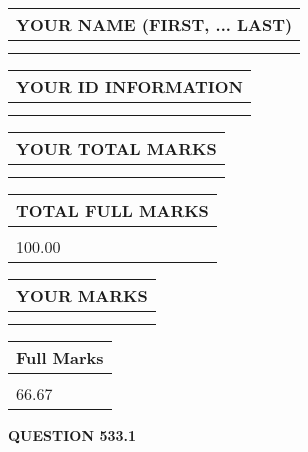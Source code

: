 \documentclass{ctexart}
\begin{document}
   
   
   
\newpage 
\setcounter{page}{ 
   533001 } 
   
   
   
   
\noindent\begin{tabular}{|l|}
\hline
YOUR NAME (FIRST, ... LAST)  \\
\hline
 \\ 
 \\ 
\hline
\end{tabular}
\hspace{0.05in} \begin{tabular}{|l|}
\hline
 YOUR   ID   INFORMATION  \\
\hline
 \\ 
 \\ 
\hline
\end{tabular}
   
   
\vspace{0.2in}\noindent\begin{tabular}{|l|}
\hline
YOUR TOTAL MARKS  \\
\hline
 \\ 
 \\ 
\hline
\end{tabular}
\hspace{0.05in} \begin{tabular}{|l|}
\hline
TOTAL FULL MARKS  \\
\hline
 \\ 
100.00 \\
\hline
\end{tabular}
   
   
 \vspace{0.2in}
 
 
 
 
   
   
  
\vspace{0.2in}
  
\noindent\begin{tabular}{|l|}
\hline
 YOUR MARKS  \\
\hline
 \\ 
 \\ 
\hline
\end{tabular}
\hspace{0.05in} \begin{tabular}{|l|}
\hline
 Full Marks  \\
\hline
 \\ 
66.67 \\
\hline
\end{tabular}
{\textbf{\Large{QUESTION
533.1 
}}}
  
\end{document}
